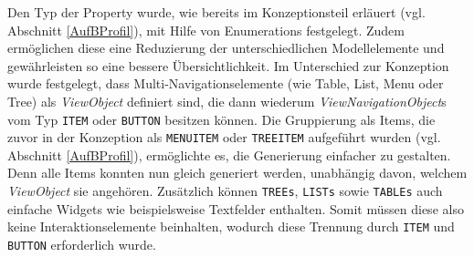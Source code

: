 Den Typ der Property wurde, wie bereits im Konzeptionsteil erläuert (vgl. Abschnitt \ref{AufBProfil}), mit Hilfe von Enumerations festgelegt. Zudem ermöglichen diese eine Reduzierung der unterschiedlichen Modellelemente und gewährleisten so eine bessere Übersichtlichkeit. Im Unterschied zur Konzeption wurde festgelegt, dass Multi-Navigationselemente (wie Table, List, Menu oder Tree) als \textit{ViewObject} definiert sind, die dann wiederum \textit{ViewNavigationObject}s vom Typ \texttt{ITEM} oder \texttt{BUTTON} besitzen können. Die Gruppierung als Items, die zuvor in der Konzeption als \texttt{MENUITEM} oder \texttt{TREEITEM} aufgeführt wurden (vgl. Abschnitt \ref{AufBProfil}), ermöglichte es, die Generierung einfacher zu gestalten. Denn alle Items konnten nun gleich generiert werden, unabhängig davon, welchem \textit{ViewObject} sie angehören. Zusätzlich können \texttt{TREEs}, \texttt{LISTs} sowie \texttt{TABLEs} auch einfache Widgets wie beispielsweise Textfelder enthalten. Somit müssen diese also keine Interaktionselemente beinhalten, wodurch diese Trennung durch \texttt{ITEM} und \texttt{BUTTON} erforderlich wurde.

